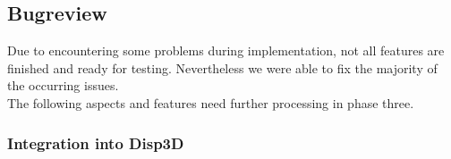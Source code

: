 \subsection{Bugreview}
Due to encountering some problems during implementation, not all features are finished and ready for testing.
Nevertheless we were able to fix the majority of the occurring issues. \\ 
The following aspects and features need further processing in phase three. 

\subsubsection{Integration into Disp3D}